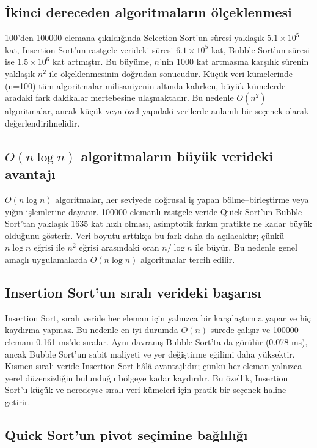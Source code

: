 \documentclass[12pt,a4paper]{article}
\begin{document}
\subsection{İkinci dereceden algoritmaların ölçeklenmesi}

100'den 100000 elemana çıkıldığında Selection Sort'un süresi yaklaşık
$5.1 \times 10^5$ kat, Insertion Sort'un rastgele verideki süresi
$6.1 \times 10^5$ kat, Bubble Sort'un süresi ise $1.5 \times 10^6$ kat
artmıştır. Bu büyüme, $n$'nin $1000$ kat artmasına karşılık sürenin yaklaşık
$n^2$ ile ölçeklenmesinin doğrudan sonucudur. Küçük veri kümelerinde (n=100)
tüm algoritmalar milisaniyenin altında kalırken, büyük kümelerde aradaki fark
dakikalar mertebesine ulaşmaktadır. Bu nedenle $O(n^2)$ algoritmalar, ancak
küçük veya özel yapıdaki verilerde anlamlı bir seçenek olarak değerlendirilmelidir.

\subsection{$O(n \log n)$ algoritmaların büyük verideki avantajı}

$O(n \log n)$ algoritmalar, her seviyede doğrusal iş yapan bölme--birleştirme
veya yığın işlemlerine dayanır. 100000 elemanlı rastgele veride Quick Sort'un
Bubble Sort'tan yaklaşık 1635 kat hızlı olması, asimptotik farkın pratikte ne
kadar büyük olduğunu gösterir. Veri boyutu arttıkça bu fark daha da açılacaktır;
çünkü $n \log n$ eğrisi ile $n^2$ eğrisi arasındaki oran $n / \log n$ ile
büyür. Bu nedenle genel amaçlı uygulamalarda $O(n \log n)$ algoritmalar tercih
edilir.

\subsection{Insertion Sort'un sıralı verideki başarısı}

Insertion Sort, sıralı veride her eleman için yalnızca bir karşılaştırma yapar
ve hiç kaydırma yapmaz. Bu nedenle en iyi durumda $O(n)$ sürede çalışır ve
100000 elemanı 0.161 ms'de sıralar. Aynı davranış Bubble Sort'ta da görülür
(0.078 ms), ancak Bubble Sort'un sabit maliyeti ve yer değiştirme eğilimi daha
yüksektir. Kısmen sıralı veride Insertion Sort hâlâ avantajlıdır; çünkü her
eleman yalnızca yerel düzensizliğin bulunduğu bölgeye kadar kaydırılır. Bu
özellik, Insertion Sort'u küçük ve neredeyse sıralı veri kümeleri için pratik bir
seçenek haline getirir.

\subsection{Quick Sort'un pivot seçimine bağlılığı}
\end{document}
